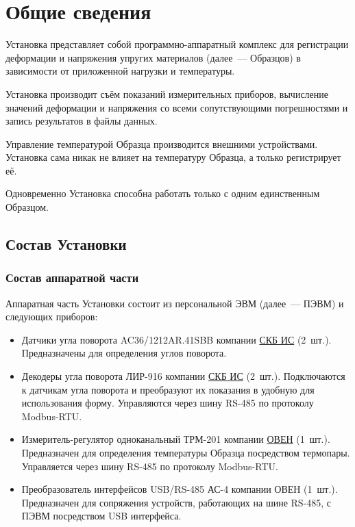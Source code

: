 \documentclass[12pt, a4paper, twocolumn]{report}
\author{Накин~А.~В.\\\href{mailto:andrey.nakin@gmail.com}{{\tt andrey.nakin@gmail.com}}}
\begin{document}
\maketitle

\tableofcontents

\chapter{Общие сведения}

Установка представляет собой программно-аппаратный комплекс для регистрации деформации и напряжения упругих материалов (далее~--- Образцов) в зависимости от приложенной нагрузки и температуры.

Установка производит съём показаний измерительных приборов, вычисление значений деформации и напряжения со всеми сопутствующими погрешностями и запись результатов в файлы данных.

Управление температурой Образца производится внешними устройствами. Установка сама никак не влияет на температуру Образца, а только регистрирует её.

Одновременно Установка способна работать только с одним единственным Образцом.

\section{Состав Установки}

\subsection{Состав аппаратной части}

Аппаратная часть Установки состоит из персональной ЭВМ (далее~--- ПЭВМ) и следующих приборов:

\begin{itemize}

\item Датчики угла поворота AC36/1212AR.41SBB компании \href{http://www.skbis.ru/}{СКБ ИС} (2~шт.). Предназначены для определения углов поворота.

\item Декодеры угла поворота ЛИР-916 компании \href{http://www.skbis.ru/}{СКБ ИС} (2~шт.). Подключаются к датчикам угла поворота и преобразуют их показания в удобную для использования форму. Управляются через шину RS-485 по протоколу Modbus-RTU.

\item Измеритель-регулятор одноканальный ТРМ-201 компании \href{http://www.owen.ru/}{ОВЕН} (1~шт.). Предназначен для определения температуры Образца посредством термопары. Управляется через шину RS-485 по протоколу Modbus-RTU.

\item Преобразователь интерфейсов USB/RS-485 АС-4 компании ОВЕН (1~шт.). Предназначен для сопряжения устройств, работающих на шине RS-485, с  ПЭВМ посредством USB интерфейса.

\end{itemize}
\end{document}

